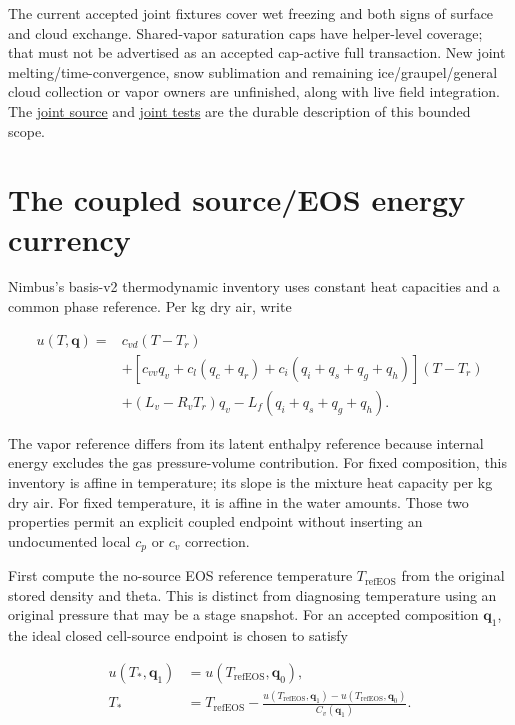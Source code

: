 \documentclass[
  11pt,
]{report}
\begin{document}
The current accepted joint fixtures cover wet freezing and both signs of
surface and cloud exchange. Shared-vapor saturation caps have
helper-level coverage; that must not be advertised as an accepted
cap-active full transaction. New joint melting/time-convergence, snow
sublimation and remaining ice/graupel/general cloud collection or vapor
owners are unfinished, along with live field integration. The
\href{../src/microphysics/schemes/milbrandt/triple_hail_shared_vapor.hpp}{joint
source} and
\href{../tests/physics/test_milbrandt_triple_hail_shared_vapor.cpp}{joint
tests} are the durable description of this bounded scope.

\section{The coupled source/EOS energy
currency}\label{the-coupled-sourceeos-energy-currency}

Nimbus's basis-v2 thermodynamic inventory uses constant heat capacities
and a common phase reference. Per kg dry air, write

\[\begin{aligned}
u(T,\boldsymbol q)={}&c_{vd}(T-T_r) \\
 &+[c_{vv}q_v+c_l(q_c+q_r)+c_i(q_i+q_s+q_g+q_h)](T-T_r) \\
 &+(L_v-R_vT_r)q_v-L_f(q_i+q_s+q_g+q_h).
\end{aligned}\]

The vapor reference differs from its latent enthalpy reference because
internal energy excludes the gas pressure-volume contribution. For fixed
composition, this inventory is affine in temperature; its slope is the
mixture heat capacity per kg dry air. For fixed temperature, it is
affine in the water amounts. Those two properties permit an explicit
coupled endpoint without inserting an undocumented local \(c_p\) or
\(c_v\) correction.

First compute the no-source EOS reference temperature
\(T_{\mathrm{refEOS}}\) from the original stored density and theta. This
is distinct from diagnosing temperature using an original pressure that
may be a stage snapshot. For an accepted composition
\(\boldsymbol q_1\), the ideal closed cell-source endpoint is chosen to
satisfy

\[\begin{aligned}
u(T_*,\boldsymbol q_1)
 &=u(T_{\mathrm{refEOS}},\boldsymbol q_0), \\
T_*
 &=T_{\mathrm{refEOS}}
   -\frac{u(T_{\mathrm{refEOS}},\boldsymbol q_1)
                -u(T_{\mathrm{refEOS}},\boldsymbol q_0)}
          {C_v(\boldsymbol q_1)}.
\end{aligned}\]
\end{document}
